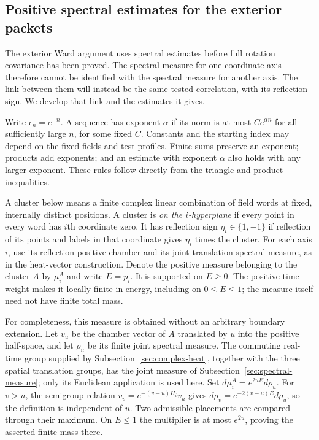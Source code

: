 \subsection{Positive spectral estimates for the exterior packets}
\label{sec:physical-ward-packet-prices}

The exterior Ward argument uses spectral estimates before full rotation
covariance has been proved. The spectral measure for one coordinate axis
therefore cannot be identified with the spectral measure for another axis.
The link between them will instead be the same tested correlation, with its
reflection sign. We develop that link and the estimates it gives.

Write $\epsilon_n=e^{-n}$. A sequence has exponent $\alpha$ if its norm
is at most $C e^{\alpha n}$ for all sufficiently large $n$, for some fixed
$C$. Constants and the starting index may depend on the fixed fields and
test profiles. Finite sums preserve an exponent; products add exponents;
and an estimate with exponent $\alpha$ also holds with any larger exponent.
These rules follow directly from the triangle and product inequalities.

A cluster below means a finite complex linear combination of field words
at fixed, internally distinct positions. A cluster is \emph{on the
$i$-hyperplane} if every point in every word has $i$th coordinate zero.
It has reflection sign $\eta_i\in\{1,-1\}$ if reflection of its points
and labels in that coordinate gives $\eta_i$ times the cluster.
For each axis $i$, use its reflection-positive chamber and its joint
translation spectral measure, as in the heat-vector construction. Denote
the positive measure belonging to the cluster $A$ by $\mu_i^A$ and write
$E=p_i$. It is supported on $E\geq0$. The positive-time weight makes it
locally finite in energy, including on $0\leq E\leq1$; the measure itself
need not have finite total mass.

For completeness, this measure is obtained without an arbitrary boundary
extension. Let $v_u$ be the chamber vector of $A$ translated by $u$ into
the positive half-space, and let $\rho_u$ be its finite joint spectral
measure. The commuting real-time group supplied by
Subsection~\ref{sec:complex-heat}, together with the three spatial translation
groups, has the joint measure of Subsection~\ref{sec:spectral-measure}; only
its Euclidean application is used here. Set
$d\mu_i^A=e^{2uE}d\rho_u$. For $v>u$, the semigroup relation
$v_v=e^{-(v-u)H_i}v_u$ gives
$d\rho_v=e^{-2(v-u)E}d\rho_u$, so the definition is independent of $u$.
Two admissible placements are compared through their maximum. On $E\leq1$
the multiplier is at most $e^{2u}$, proving the asserted finite mass there.

